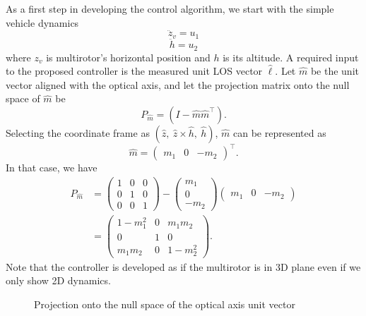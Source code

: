 As a first step in developing the control algorithm, we start with the simple vehicle dynamics  
\begin{equation}
\ddot{z}_v=u_1
\end{equation}
\begin{equation}
\ddot{h}=u_2
\end{equation} 
where $z_v$ is multirotor's horizontal position and $h$ is its altitude.
A required input to the proposed controller is the measured unit LOS vector $\hat{\ell}$. 
Let $\hat{m}$ be the unit vector aligned with the optical axis, and let the projection matrix onto the null space of $\hat{m}$ be 
\begin{equation}
P_{\hat{m}}=(I-\hat{m}\hat{m}^\top).
\end{equation}
Selecting the coordinate frame as $(\hat{z},\ \hat{z}\times\hat{h},\ \hat{h})$, $\hat{m}$ can be represented as 
\begin{equation}
\hat{m}=\begin{pmatrix}
m_1 & 0 & -m_2
\end{pmatrix}^\top.
\end{equation}
In that case, we have 
\begin{align}
P_{\hat{m}}&=\begin{pmatrix}1 & 0 & 0 \\ 0 & 1 & 0 \\ 0 & 0 & 1 \end{pmatrix}
-\begin{pmatrix} m_1 \\ 0 \\ -m_2 \end{pmatrix}\begin{pmatrix} m_1 & 0 & -m_2 \end{pmatrix}
\\&=\begin{pmatrix}1-m_1^2 & 0 & m_1m_2 \\ 0 & 1 & 0 \\ m_1m_2 & 0 & 1-m_2^2 \end{pmatrix}.
\label{p_mhat}
\end{align}
Note that the controller is developed as if the multirotor is in 3D plane even if we only show 2D dynamics.
\begin{figure}[htbp]
	\centering
	\caption{Projection onto the null space of the optical axis unit vector}
	\label{projection}
\end{figure}
